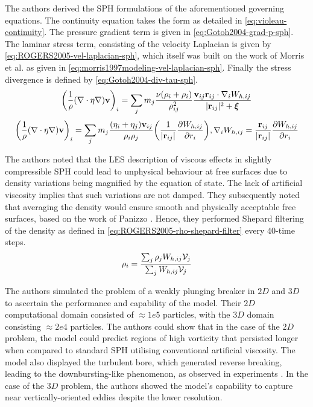 The authors derived the SPH formulations of the aforementioned governing equations. The continuity equation takes the form as detailed in \ref{eq:violeau-continuity}. The pressure gradient term is given in \ref{eq:Gotoh2004-grad-p-sph}. The laminar stress term, consisting of the velocity Laplacian is given by \ref{eq:ROGERS2005-vel-laplacian-sph}, which itself was built on the work of Morris et al. \parencite{morris1997modeling} as given in \ref{eq:morris1997modeling-vel-laplacian-sph}. Finally the stress divergence is defined by \ref{eq:Gotoh2004-div-tau-sph}.
\begin{equation}
	\bigg( \frac{1}{\rho} (\nabla \cdot \eta \nabla) \vect{v} \bigg)_i = \sum_j m_j \frac{\nu (\rho_i + \rho_i)}{\rho_{ij}^2} \frac{\VIJ \RIJ \cdot \DWIJ}{\RtwoIJ + \MachineEpsilon}
	\label{eq:ROGERS2005-vel-laplacian-sph}
\end{equation}
\begin{equation}
	\bigg( \frac{1}{\rho} (\nabla \cdot \eta \nabla) \vect{v} \bigg)_i = \sum_j m_j \frac{(\eta_i + \eta_j) \VIJ}{\rho_i \rho_j} \bigg( \frac{1}{\RtwoIJ[]} \PartialDerivative[r_i]{\WIJ} \bigg), \DWIJ = \frac{\RIJ}{\RtwoIJ[]} \PartialDerivative[r_i]{\WIJ}
	\label{eq:morris1997modeling-vel-laplacian-sph}
\end{equation}

The authors noted that the LES description of viscous effects in
slightly compressible SPH could lead to unphysical behaviour at free surfaces due to density variations being magnified by the equation of state. The lack of artificial viscosity implies that such variations are not damped. They subsequently noted that averaging the density would ensure smooth and physically acceptable free surfaces, based on the work of Panizzo \parencite{panizzo2004physical}. Hence, they performed Shepard filtering of the density as defined in \ref{eq:ROGERS2005-rho-shepard-filter} every 40-time steps.
\begin{equation}
	\rho_i = \frac{\sum_j \rho_j \WIJ \Vol_j}{\sum_j \WIJ \Vol_j}
	\label{eq:ROGERS2005-rho-shepard-filter}
\end{equation}

The authors simulated the problem of a weakly plunging breaker in $2D$ and $3D$ to ascertain the performance and capability of the model. Their $2D$ computational domain consisted of $\approx 1e5$ particles, with the $3D$ domain consisting $\approx 2e4$ particles.
The authors could show that in the case of the $2D$ problem, the model could predict regions of high vorticity that persisted longer when compared to standard SPH utilising conventional artificial viscosity. The model also displayed the turbulent bore, which generated reverse breaking, leading to the downbursting-like phenomenon, as observed in experiments \parencite{kubo2001large}.
In the case of the $3D$ problem, the authors showed the model's capability to capture near vertically-oriented eddies despite the lower resolution. 

